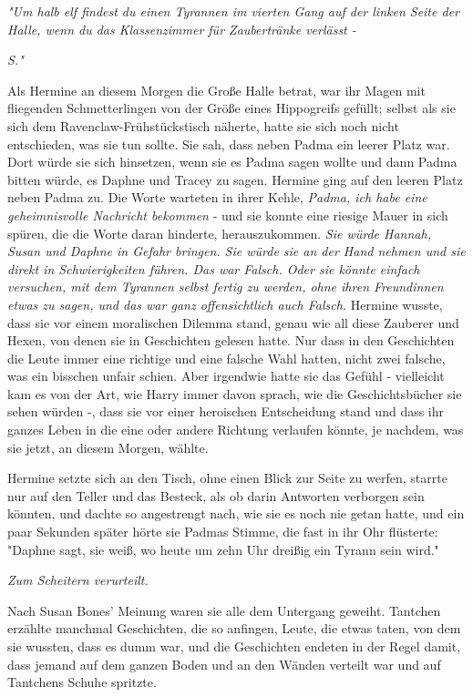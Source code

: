 {\emph{"Um halb elf findest du einen Tyrannen im vierten Gang auf der linken Seite der Halle, wenn du das Klassenzimmer für Zaubertränke verlässt -}

\emph{S."}

Als Hermine an diesem Morgen die Große Halle betrat, war ihr Magen mit fliegenden Schmetterlingen von der Größe eines Hippogreifs gefüllt; selbst als sie sich dem Ravenclaw-Frühstückstisch näherte, hatte sie sich noch nicht entschieden, was sie tun sollte. Sie sah, dass neben Padma ein leerer Platz war. Dort würde sie sich hinsetzen, wenn sie es Padma sagen wollte und dann Padma bitten würde, es Daphne und Tracey zu sagen. Hermine ging auf den leeren Platz neben Padma zu. Die Worte warteten in ihrer Kehle, \emph{Padma, ich habe eine geheimnisvolle Nachricht bekommen} - und sie konnte eine riesige Mauer in sich spüren, die die Worte daran hinderte, herauszukommen. \emph{Sie würde Hannah, Susan und Daphne in Gefahr bringen. Sie würde sie an der Hand nehmen und sie direkt in Schwierigkeiten führen. Das war Falsch. Oder sie könnte einfach versuchen, mit dem Tyrannen selbst fertig zu werden, ohne ihren Freundinnen etwas zu sagen, und das war ganz offensichtlich auch Falsch.} Hermine wusste, dass sie vor einem moralischen Dilemma stand, genau wie all diese Zauberer und Hexen, von denen sie in Geschichten gelesen hatte. Nur dass in den Geschichten die Leute immer eine richtige und eine falsche Wahl hatten, nicht zwei falsche, was ein bisschen unfair schien. Aber irgendwie hatte sie das Gefühl - vielleicht kam es von der Art, wie Harry immer davon sprach, wie die Geschichtsbücher sie sehen würden -, dass sie vor einer heroischen Entscheidung stand und dass ihr ganzes Leben in die eine oder andere Richtung verlaufen könnte, je nachdem, was sie jetzt, an diesem Morgen, wählte.

Hermine setzte sich an den Tisch, ohne einen Blick zur Seite zu werfen, starrte nur auf den Teller und das Besteck, als ob darin Antworten verborgen sein könnten, und dachte so angestrengt nach, wie sie es noch nie getan hatte, und ein paar Sekunden später hörte sie Padmas Stimme, die fast in ihr Ohr flüsterte:\\ "Daphne sagt, sie weiß, wo heute um zehn Uhr dreißig ein Tyrann sein wird."

\emph{Zum Scheitern verurteilt.}

Nach Susan Bones' Meinung waren sie alle dem Untergang geweiht. Tantchen erzählte manchmal Geschichten, die so anfingen, Leute, die etwas taten, von dem sie wussten, dass es dumm war, und die Geschichten endeten in der Regel damit, dass jemand auf dem ganzen Boden und an den Wänden verteilt war und auf Tantchens Schuhe spritzte.

}
